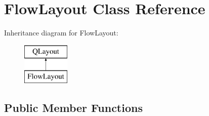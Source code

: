 \hypertarget{classFlowLayout}{\section{Flow\+Layout Class Reference}
\label{classFlowLayout}
}
Inheritance diagram for Flow\+Layout\+:\begin{figure}[H]
\begin{center}
\leavevmode
\includegraphics[height=2.000000cm]{classFlowLayout}
\end{center}
\end{figure}
\subsection*{Public Member Functions}
